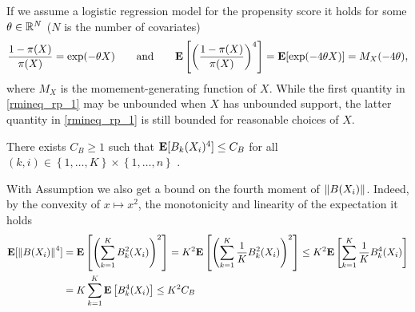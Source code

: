 \begin{remark}
  If we assume a logistic regression model for the propensity score
  it holds for some $\theta \in \mathbb{R}^N$ ($N$ is the number of covariates)
  \begin{gather}
    \label{rmineq_rp_1}
    \frac{1-\pi(X)}{\pi(X)}
    =
    \exp(-\theta X)
    \qquad
    \text{and}
    \qquad
    \mathbf{E}
    \left[ 
    \left(
    \frac{1-\pi(X)}{\pi(X)}
    \right)^4
    \right]
    =
    \mathbf{E}
    [
    \exp(-4\theta X)
    ]
    =
    M_X(-4\theta)
    ,
  \end{gather}
  where $M_X$ is the momement-generating function of $X$.
   While the first quantity in \eqref{rmineq_rp_1}
   may be unbounded when $X$ has unbounded support, the latter quantity in \eqref{rmineq_rp_1} is still bounded for reasonable choices of $X$.
\end{remark}
\begin{assumption}
  There exists $C_B \ge 1$ such that
  $
  \mathbf{E}[
    B_k(X_i)^4
  ]
  \le C_B
  $
  for all $(k,i)\in \left\{ 1, \ldots, K \right\}\times \left\{ 1, \ldots, n \right\}$
  .
\end{assumption}
\begin{remark}
With Assumption we also get a bound on the fourth moment of 
  $
  \left\lVert B(X_{i})\right\rVert
  $. Indeed, by the convexity of 
  $x\mapsto x^2$, the monotonicity and linearity of the expectation it holds   
  \begin{align}
    \begin{split}
  \mathbf{E}[
  \left\lVert B(X_{i})\right\rVert^4
  ] 
  &=
  \mathbf{E}
  \left[ 
    \left( 
      \sum_{k=1}^{K}
      B_k^2(X_i)
    \right)^2
  \right]
  =
  K^2
  \mathbf{E}
  \left[ 
    \left( 
      \sum_{k=1}^{K}
      \frac{1}{K}
      B_k^2(X_i)
    \right)^2
  \right]
  \le
  K^2
  \mathbf{E}
  \left[ 
      \sum_{k=1}^{K}
      \frac{1}{K}
      B_k^4(X_i)
  \right]
  \\
  &=
  K
  \sum_{k=1}^{K}
  \mathbf{E}
  \left[ 
      B_k^4(X_i)
  \right]
  \le
  K^2 C_B
  \end{split}
  \end{align}
\end{remark}
